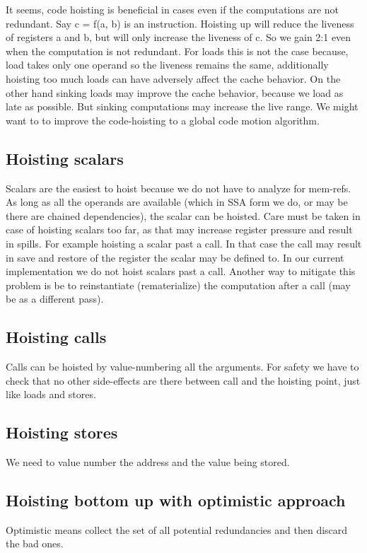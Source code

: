 \begin{section}
It seems, code hoisting is beneficial in cases even if the computations are not redundant.
Say c = f(a, b) is an instruction. Hoisting up will reduce the liveness of registers a and b, but will only increase the liveness of c. So we gain 2:1 even when the computation is not redundant. For loads this is not the case because, load takes only one operand so the liveness remains the same, additionally hoisting too much loads can have adversely affect the cache behavior.
On the other hand sinking loads may improve the cache behavior, because we load as late as possible. But sinking computations may increase the live range.
We might want to to improve the code-hoisting to a global code motion algorithm.

\section{Hoisting scalars}
Scalars are the easiest to hoist because we do not have to analyze for mem-refs. As long as all the
operands are available (which in SSA form we do, or may be there are chained dependencies), the scalar can
be hoisted. Care must be taken in case of hoisting scalars too far, as that may increase register pressure
and result in spills. For example hoisting a scalar past a call. In that case the call may result in
save and restore of the register the scalar may be defined to. In our current implementation
we do not hoist scalars past a call. Another way to mitigate this problem is be to
reinstantiate (rematerialize) the computation after a call (may be as a different pass).

\section{Hoisting calls}
Calls can be hoisted by value-numbering all the arguments. For safety we have to check that no other side-effects are there
between call and the hoisting point, just like loads and stores.

\section{Hoisting stores}
We need to value number the address and the value being stored.

\section{Hoisting bottom up with optimistic approach}
Optimistic means collect the set of all potential redundancies and then discard the bad ones.


\end{section}
